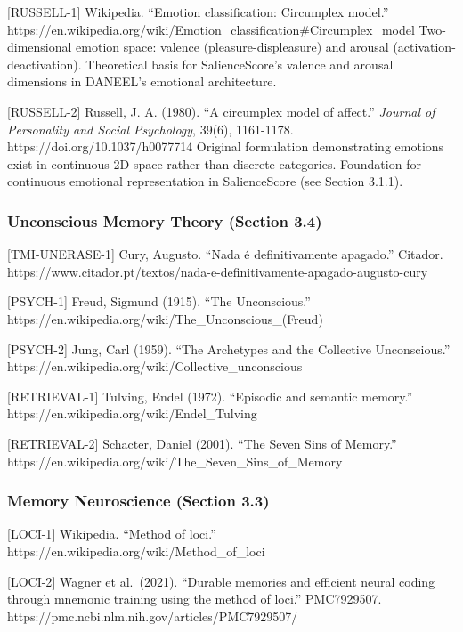 \documentclass[
]{article}
\begin{document}
{[}RUSSELL-1{]} Wikipedia. ``Emotion classification: Circumplex model.''
https://en.wikipedia.org/wiki/Emotion\_classification\#Circumplex\_model
Two-dimensional emotion space: valence (pleasure-displeasure) and
arousal (activation-deactivation). Theoretical basis for SalienceScore's
valence and arousal dimensions in DANEEL's emotional architecture.

{[}RUSSELL-2{]} Russell, J. A. (1980). ``A circumplex model of affect.''
\emph{Journal of Personality and Social Psychology}, 39(6), 1161-1178.
https://doi.org/10.1037/h0077714 Original formulation demonstrating
emotions exist in continuous 2D space rather than discrete categories.
Foundation for continuous emotional representation in SalienceScore (see
Section 3.1.1).

\hypertarget{unconscious-memory-theory-section-3.4}{%
\subsubsection{Unconscious Memory Theory (Section
3.4)}\label{unconscious-memory-theory-section-3.4}}

{[}TMI-UNERASE-1{]} Cury, Augusto. ``Nada é definitivamente apagado.''
Citador.
https://www.citador.pt/textos/nada-e-definitivamente-apagado-augusto-cury

{[}PSYCH-1{]} Freud, Sigmund (1915). ``The Unconscious.''
https://en.wikipedia.org/wiki/The\_Unconscious\_(Freud)

{[}PSYCH-2{]} Jung, Carl (1959). ``The Archetypes and the Collective
Unconscious.'' https://en.wikipedia.org/wiki/Collective\_unconscious

{[}RETRIEVAL-1{]} Tulving, Endel (1972). ``Episodic and semantic
memory.'' https://en.wikipedia.org/wiki/Endel\_Tulving

{[}RETRIEVAL-2{]} Schacter, Daniel (2001). ``The Seven Sins of Memory.''
https://en.wikipedia.org/wiki/The\_Seven\_Sins\_of\_Memory

\hypertarget{memory-neuroscience-section-3.3}{%
\subsubsection{Memory Neuroscience (Section
3.3)}\label{memory-neuroscience-section-3.3}}

{[}LOCI-1{]} Wikipedia. ``Method of loci.''
https://en.wikipedia.org/wiki/Method\_of\_loci

{[}LOCI-2{]} Wagner et al.~(2021). ``Durable memories and efficient
neural coding through mnemonic training using the method of loci.''
PMC7929507. https://pmc.ncbi.nlm.nih.gov/articles/PMC7929507/
\end{document}
